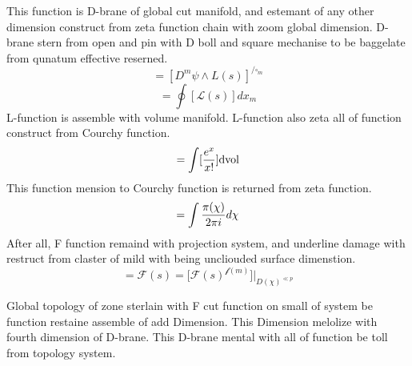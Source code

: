 \documentclass{jsarticle}
\begin{document}
    This function is D-brane of global cut manifold, and estemant of
  any other dimension construct from zeta function chain with
  zoom global dimension.
    D-brane stern from open and pin with D boll and square
    mechanise to be baggelate from qunatum effective reserned. 
  $$ = [D^{m}\psi \wedge L(s)]^{{/} \square_m }$$
  $$ = \oint[\mathcal{L}(s)]dx_m $$
    L-function is assemble with volume manifold.
  L-function also zeta all of function construct from Courchy function.
  $$ = \int [{e^{x} \over {x!}}]\mathrm{dvol} $$
     This function mension to 
  Courchy function is returned from zeta function.
  $$ = \int {\pi(\chi) \over {2 \pi i}}d\chi $$
     After all, F function remaind with projection system,
  and underline damage with restruct from claster of mild 
  with being uncliouded surface dimenstion.
  $$ = \mathcal{F}(s) = [{\mathcal{F}(s)^{\mathcal{f}(m)}]|_{{D(\chi)}^
  {\ll p}}} $$

     Global topology of zone sterlain with F cut function on small of
  system be function restaine assemble of add Dimension.
  This Dimension melolize with fourth dimension of D-brane.
  This D-brane mental with all of function be toll from topology
  system.
\end{document}

